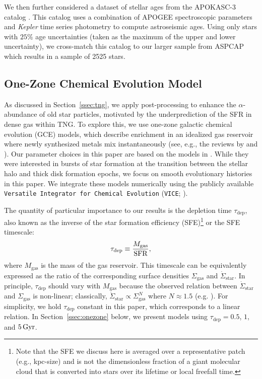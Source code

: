 We then further considered a dataset of stellar ages from the APOKASC-3 catalog \citep{2024arXiv241000102P}. This catalog uses a combination of APOGEE spectroscopic parameters and \textit{Kepler} time series photometry to compute astroseismic ages. Using only stars with $25\%$ age uncertainties (taken as the maximum of the upper and lower uncertainty), we cross-match this catalog to our larger sample from ASPCAP which results in a sample of 2525 stars.

\subsection{One-Zone Chemical Evolution Model}\label{ssec:onezone_met}
As discussed in Section~\ref{ssec:tng}, we apply post-processing to enhance the $\alpha$-abundance of old star particles, motivated by the underprediction of the SFR in dense gas within TNG. To explore this, we use one-zone galactic chemical evolution (GCE) models, which describe enrichment in an idealized gas reservoir where newly synthesized metals mix instantaneously (see, e.g., the reviews by \citealt{Tinsley1980} and \citealt{Matteucci2021}). Our parameter choices in this paper are based on the models in \citet{2022arXiv220402989C}. While they were interested in bursts of star formation at the transition between the stellar halo and thick disk formation epochs, we focus on smooth evolutionary histories in this paper. We integrate these models numerically using the publicly available {\tt Versatile Integrator for Chemical Evolution} ({\tt VICE}; \citealt{2020MNRAS.498.1364J}).

The quantity of particular importance to our results is the depletion time $\tau_{\textrm{dep}}$, also known as the inverse of the star formation efficiency (SFE)\footnote{Note that the SFE we discuss here is averaged over a representative patch (e.g., kpc-size) and is not the dimensionless fraction of a giant molecular cloud that is converted into stars over its lifetime or local freefall time.} or the SFE timescale:
\begin{equation}
\tau_{\textrm{dep}} \equiv \frac{M_{\textrm{gas}}}{\textrm{SFR}},
\end{equation}
where $M_{\textrm{gas}}$ is the mass of the gas reservoir. This timescale can be equivalently expressed as the ratio of the corresponding surface densities $\Sigma_{\textrm{gas}}$ and $\dot{\Sigma}_{\textrm{star}}$. In principle, $\tau_{\textrm{dep}}$ should vary with $M_{\textrm{gas}}$ because the observed relation between $\dot{\Sigma}_{\textrm{star}}$ and $\Sigma_{\textrm{gas}}$ is non-linear; classically, $\dot{\Sigma}_{\textrm{star}} \propto \Sigma_{\textrm{gas}}^N$ where $N \approx 1.5$ (e.g. \citealt{Schmidt1959, Kennicutt1998}). For simplicity, we hold $\tau_{\textrm{dep}}$ constant in this paper, which corresponds to a linear relation. In Section~\ref{ssec:onezone} below, we present models using $\tau_{\textrm{dep}} = 0.5$, $1$, and $5\,\textrm{Gyr}$.


